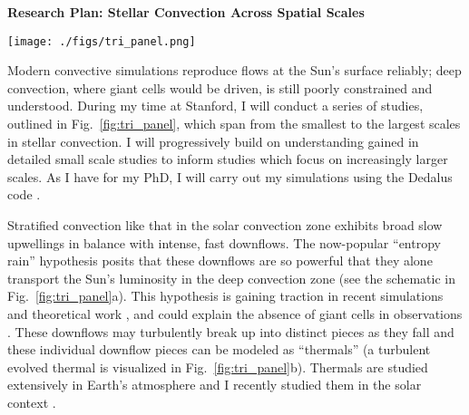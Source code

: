 \documentclass[onecolumn, 11pt, hmargin=1in, vmargin=1in]{aastex62}
\begin{document}
\begin{center}
\vspace{-5pt}
\textbf{Research Plan: Stellar Convection Across Spatial Scales}
\vspace{-11pt}
\end{center}
\begin{figure*}[b]
	\begin{center}
	\vspace{-8pt}
    \texttt{[image: ./figs/tri\_panel.png]}
	\vspace{-8pt}
    \caption{ 
	(a) A schematic of the interior of Sun-like stars under the entropy rain hypothesis, where cold droplets of fluid carry the stellar luminosity below a small traditional convective surface layer.
	The scope of two experiments proposed here are boxed and labeled (``Thermals'' and ``RCB''), and the third experiment proposed here would contain the full spherical volume of the star, from which this wedge is taken.
	(b) A 3D visualization of entropy perturbations within the downward-propagating reference frame of a turbulent ``thermal,'' which models a stellar downflow.
	(c) A schematic of the radiative-convective boundary (RCB), where downflows impinge upon a stable layer and excite gravity waves within that layer.
	\label{fig:tri_panel} }
	\end{center}
\end{figure*}


Modern convective simulations reproduce flows at the Sun's surface reliably; deep convection, where giant cells would be driven, is still poorly constrained and understood.
During my time at Stanford, I will conduct a series of studies, outlined in Fig.~\ref{fig:tri_panel}, which span from the smallest to the largest scales in stellar convection.
I will progressively build on understanding gained in detailed small scale studies to inform studies which focus on increasingly larger scales.
As I have for my PhD, I will carry out my simulations using the Dedalus code \citep{burns&all2019}.

Stratified convection like that in the solar convection zone exhibits broad slow upwellings in balance with intense, fast downflows.
The now-popular ``entropy rain'' hypothesis posits that these downflows are so powerful that they alone transport the Sun's luminosity in the deep convection zone (see the schematic in Fig.~\ref{fig:tri_panel}a).
This hypothesis is gaining traction in recent simulations \cite{kapyla&all2017} and theoretical work \citep{brandenburg2016}, and could explain the absence of giant cells in observations \citep{hanasoge&all2015}.
These downflows may turbulently break up into distinct pieces as they fall and these individual downflow pieces can be modeled as ``thermals'' (a turbulent evolved thermal is visualized in Fig.~\ref{fig:tri_panel}b).
Thermals are studied extensively in Earth's atmosphere \citep{lecoanet&jeevanjee2019} and I recently studied them in the solar context \citep{andersLB2019}.
\end{document}
